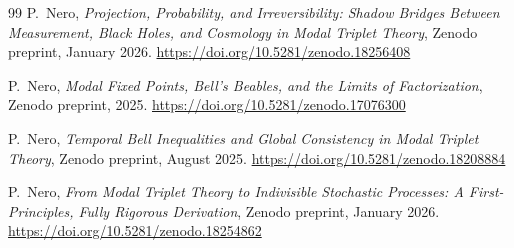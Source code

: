 \documentclass[11pt]{article}
\begin{document}
\begin{thebibliography}{99}
P.~Nero,
\emph{Projection, Probability, and Irreversibility: Shadow Bridges Between Measurement, Black Holes, and Cosmology in Modal Triplet Theory},
Zenodo preprint, January 2026.
\url{https://doi.org/10.5281/zenodo.18256408}

P.~Nero,
\emph{Modal Fixed Points, Bell’s Beables, and the Limits of Factorization},
Zenodo preprint, 2025.
\url{https://doi.org/10.5281/zenodo.17076300}

P.~Nero,
\emph{Temporal Bell Inequalities and Global Consistency in Modal Triplet Theory},
Zenodo preprint, August 2025.
\url{https://doi.org/10.5281/zenodo.18208884}

P.~Nero,
\emph{From Modal Triplet Theory to Indivisible Stochastic Processes: A First-Principles, Fully Rigorous Derivation},
Zenodo preprint, January 2026.
\url{https://doi.org/10.5281/zenodo.18254862}

\end{thebibliography}
\end{document}

